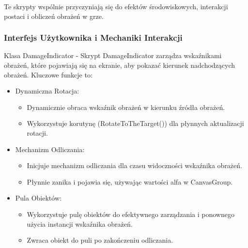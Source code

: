 Te skrypty wspólnie przyczyniają się do efektów środowiskowych, interakcji postaci i obliczeń obrażeń w grze.

\subsubsection{Interfejs Użytkownika i Mechaniki Interakcji}

Klasa DamageIndicator -
Skrypt DamageIndicator zarządza wskaźnikami obrażeń, które pojawiają się na ekranie, aby pokazać kierunek nadchodzących obrażeń. Kluczowe funkcje to:
\begin{itemize}
\item Dynamiczna Rotacja:
\begin{itemize}
\item Dynamicznie obraca wskaźnik obrażeń w kierunku źródła obrażeń.
\item Wykorzystuje korutynę (RotateToTheTarget()) dla płynnych aktualizacji rotacji.
\end{itemize}
\item Mechanizm Odliczania:
\begin{itemize}
\item Inicjuje mechanizm odliczania dla czasu widoczności wskaźnika obrażeń.
\item Płynnie zanika i pojawia się, używając wartości alfa w CanvasGroup.
\end{itemize}
\item Pula Obiektów:
\begin{itemize}
\item Wykorzystuje pulę obiektów do efektywnego zarządzania i ponownego użycia instancji wskaźnika obrażeń.
\item Zwraca obiekt do puli po zakończeniu odliczania.
\end{itemize}
\end{itemize}

